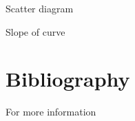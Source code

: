 \documentclass[12pt,ignorenonframetext,aspectratio=169]{beamer}
\begin{document}
\begin{frame}{Scatter diagram}
\protect\hypertarget{scatter-diagram}{}
\end{frame}

\begin{frame}{Slope of curve}
\protect\hypertarget{slope-of-curve}{}
\end{frame}

\hypertarget{bibliography}{%
\section{Bibliography}\label{bibliography}}

\begin{frame}{For more information}
\protect\hypertarget{for-more-information}{}
\end{frame}
\end{document}
